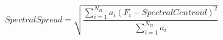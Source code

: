 \begin{displaymath}
\mathit{SpectralSpread} = \sqrt{\frac{\sum_{i=1}^{N_B} a_i (F_i - \mathit{SpectralCentroid})^2}{\sum_{i=1}^{N_B} a_i}}
\label{eq:spectral_spread}
\end{displaymath}
